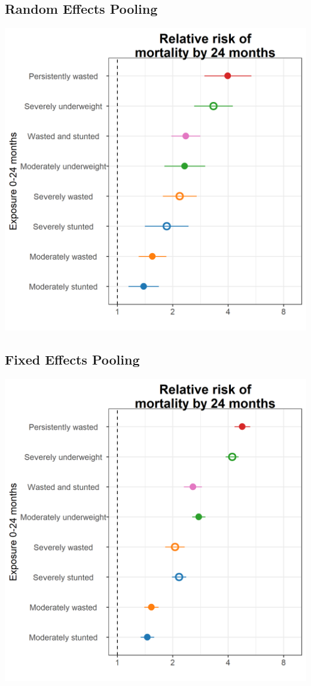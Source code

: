 \documentclass[9pt,]{book}
\begin{document}
\subsection{Random Effects Pooling}\label{random-effects-pooling-1}

\includegraphics[width=21.67in]{figure-copies/fig-mort-024}

\subsection{Fixed Effects Pooling}\label{fixed-effects-pooling-1}

\includegraphics[width=21.67in]{figure-copies/fig-mort-024_FE}
\end{document}
